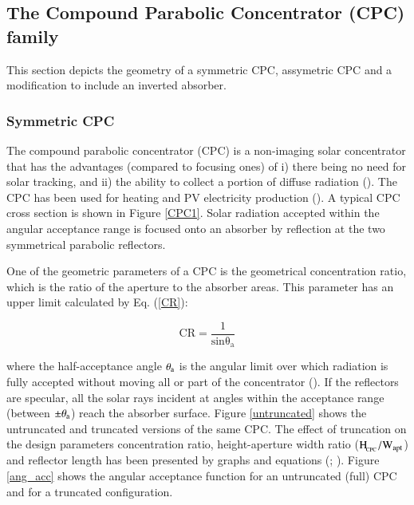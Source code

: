 
\subsection{The Compound Parabolic Concentrator (CPC) family}

This section depicts the geometry of a symmetric CPC, assymetric CPC and a modification to include an inverted absorber.

\subsubsection{Symmetric CPC} 

The compound parabolic concentrator (CPC) is a non-imaging solar concentrator that has the advantages (compared to focusing ones) of i) there being no need for solar tracking, and ii) the ability to collect a portion of diffuse radiation (\cite{Winston1974}). The CPC has been used for heating and PV electricity production (\cite{Jaaz2017}). A typical CPC cross section is shown in Figure \ref{CPC1}. Solar radiation accepted within the angular acceptance range is focused onto an absorber by reflection at the two symmetrical parabolic reflectors. 


One of the geometric parameters of a CPC is the geometrical concentration ratio, which is the ratio of the aperture to the absorber areas. This parameter has an upper limit calculated by Eq. (\ref{CR}):

\begin{equation}
	\mathrm{CR = \frac{1}{sin\theta_a}}
	\label{CR}
\end{equation}

\noindent where the half-acceptance angle $\rm{\theta_a}$ is the angular limit over which radiation is fully accepted without moving all or part of the concentrator (\cite{Rabl1976a}). If the reflectors are specular, all the solar rays incident at angles within the acceptance range (between $\pm \theta_{\rm{a}}$) reach the absorber surface. Figure \ref{untruncated} shows the untruncated and truncated versions of the same CPC. The effect of truncation on the design parameters concentration ratio, height-aperture width ratio ($\rm{H_{\!_{CPC}}/{W_{apt}}}$) and reflector length has been presented by graphs and equations (\cite{McIntire1979}; \cite{Rabl1976}). Figure \ref{ang_acc} shows the angular acceptance function for an untruncated (full) CPC and for a truncated configuration.

